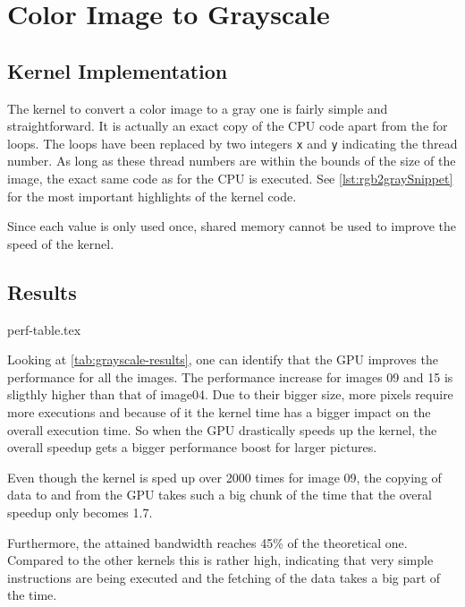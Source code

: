 \documentclass[final]{report}
\begin{document}
\chapter{Color Image to Grayscale}\label{ch:grayscale}

\section{Kernel Implementation}\label{sec:rgb2gray}
The kernel to convert a color image to a gray one is fairly simple and straightforward.
It is actually an exact copy of the CPU code apart from the for loops.
The loops have been replaced by two integers \texttt{x} and \texttt{y} indicating the thread number.
As long as these thread numbers are within the bounds of the size of the image, the exact same code as for the CPU is executed.
See \cref{lst:rgb2graySnippet} for the most important highlights of the kernel code.


Since each value is only used once, shared memory cannot be used to improve the speed of the kernel.


\section{Results}
{perf-table.tex}

Looking at \cref{tab:grayscale-results}, one can identify that the GPU improves the performance for all the images.
The performance increase for images 09 and 15 is sligthly higher than that of image04.
Due to their bigger size, more pixels require more executions and because of it the kernel time has a bigger impact on the overall execution time.
So when the GPU drastically speeds up the kernel, the overall speedup gets a bigger performance boost for larger pictures.

Even though the kernel is sped up over 2000 times for image 09, the copying of data to and from the GPU takes such a big chunk of the time that the overal speedup only becomes 1.7.

Furthermore, the attained bandwidth reaches 45\% of the theoretical one.
Compared to the other kernels this is rather high, indicating that very simple instructions are being executed and the fetching of the data takes a big part of the time.
\end{document}
